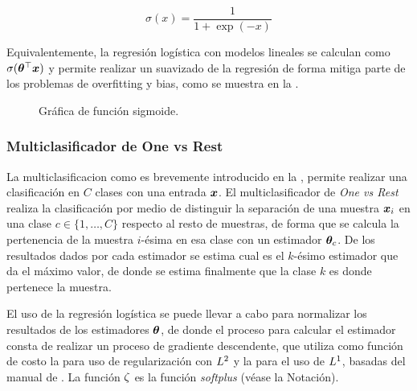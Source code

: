 \begin{equation} \label{eq:logits-formula}
  \sigma(x) = \frac{1} {1 + \exp(-x)}
\end{equation}

Equivalentemente, la regresión logística con modelos lineales se calculan como $\sigma({\bm{\theta}}^{\top} {\bm{x}})$ y permite realizar un suavizado de la regresión de forma mitiga parte de los problemas de \gls{overfitting} y \gls{bias}, como se muestra en la .

\begin{figure}[H]
  \centering
\decoRule
\caption[Gráfica de función sigmoide]{Gráfica de función sigmoide.}
\label{fig:logits-example}
\end{figure}


\subsubsection{Multiclasificador de One vs Rest}
La multiclasificacion como es brevemente introducido en la , permite realizar una clasificación en $C$ clases con una entrada ${\bm{x}}$. El multiclasificador de \emph{One vs Rest} realiza la clasificación por medio de distinguir la separación de una muestra ${\bm{x}}_i$ en una clase $c \in \{1, \ldots, C\}$ respecto al resto de muestras, de forma que se calcula la pertenencia de la muestra $i$-\'esima en esa clase con un estimador ${\bm{\theta}}_c$. De los resultados dados por cada estimador se estima cual es el $k$-\'esimo estimador que da el máximo valor, de donde se estima finalmente que la clase $k$ es donde pertenece la muestra.

El uso de la regresión logística se puede llevar a cabo para normalizar los resultados de los estimadores ${\bm{\theta}}$, de donde el proceso para calcular el estimador consta de realizar un proceso de gradiente descendente, que utiliza como función de costo la  para uso de regularización con $L^2$ y la  para el uso de $L^1$, basadas del manual de \cite{sklearn_api}. La función $\zeta$ es la función \emph{softplus} (véase la Notación).

